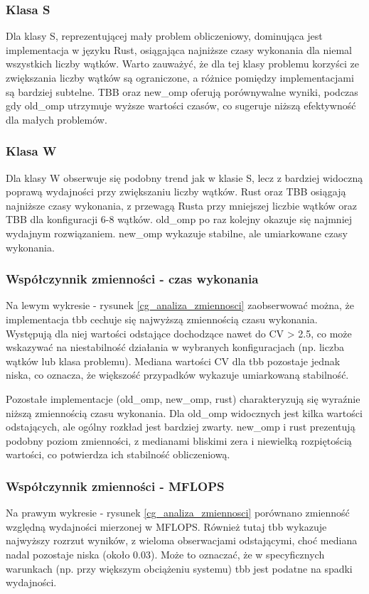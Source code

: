 \subsubsection{Klasa S}
Dla klasy S, reprezentującej mały problem obliczeniowy, dominująca jest implementacja w języku Rust, osiągająca najniższe czasy wykonania dla niemal wszystkich liczby wątków. Warto zauważyć, że dla tej klasy problemu korzyści ze zwiększania liczby wątków są ograniczone, a różnice pomiędzy implementacjami są bardziej subtelne. TBB oraz new\_omp oferują porównywalne wyniki, podczas gdy old\_omp utrzymuje wyższe wartości czasów, co sugeruje niższą efektywność dla małych problemów.

\subsubsection{Klasa W}
Dla klasy W obserwuje się podobny trend jak w klasie S, lecz z bardziej widoczną poprawą wydajności przy zwiększaniu liczby wątków. Rust oraz TBB osiągają najniższe czasy wykonania, z przewagą Rusta przy mniejszej liczbie wątków oraz TBB dla konfiguracji 6-8 wątków. old\_omp po raz kolejny okazuje się najmniej wydajnym rozwiązaniem. new\_omp wykazuje stabilne, ale umiarkowane czasy wykonania.

\subsubsection{Współczynnik zmienności - czas wykonania}
Na lewym wykresie - rysunek \ref{cg_analiza_zmiennosci} zaobserwować można, że implementacja tbb cechuje się najwyższą zmiennością czasu wykonania. Występują dla niej wartości odstające dochodzące nawet do CV > 2.5, co może wskazywać na niestabilność działania w wybranych konfiguracjach (np. liczba wątków lub klasa problemu). Mediana wartości CV dla tbb pozostaje jednak niska, co oznacza, że większość przypadków wykazuje umiarkowaną stabilność.

Pozostałe implementacje (old\_omp, new\_omp, rust) charakteryzują się wyraźnie niższą zmiennością czasu wykonania. Dla old\_omp widocznych jest kilka wartości odstających, ale ogólny rozkład jest bardziej zwarty. new\_omp i rust prezentują podobny poziom zmienności, z medianami bliskimi zera i niewielką rozpiętością wartości, co potwierdza ich stabilność obliczeniową.

\subsubsection{Współczynnik zmienności - MFLOPS}
Na prawym wykresie - rysunek \ref{cg_analiza_zmiennosci} porównano zmienność względną wydajności mierzonej w MFLOPS. Również tutaj tbb wykazuje najwyższy rozrzut wyników, z wieloma obserwacjami odstającymi, choć mediana nadal pozostaje niska (około 0.03). Może to oznaczać, że w specyficznych warunkach (np. przy większym obciążeniu systemu) tbb jest podatne na spadki wydajności.

